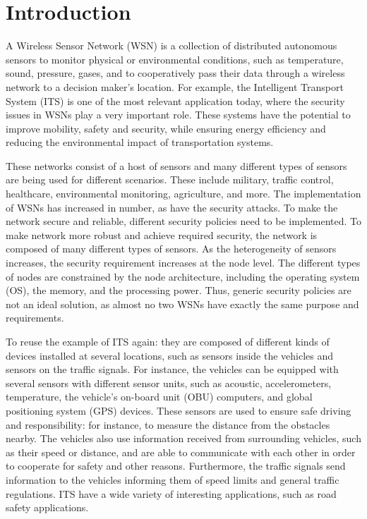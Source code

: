 \documentclass[12pt,a4paper,twoside]{report}
\begin{document}
\section{Introduction}
A Wireless Sensor Network (WSN) is a collection of distributed autonomous sensors to monitor physical or environmental conditions, such as temperature, sound, pressure, gases, and to cooperatively pass their data through a wireless network to a decision maker's location. For example, the Intelligent Transport System (ITS) is one of the most relevant application today, where the security issues in WSNs play a very important role. These systems have the potential to improve mobility, safety and security, while ensuring energy efficiency and reducing the environmental impact of transportation systems. \par
These networks consist of a host of sensors and many different types of sensors are being used for different scenarios. These include military, traffic control, healthcare, environmental monitoring, agriculture, and more. The implementation of WSNs has increased in number, as have the security attacks. To make the network secure and reliable, different security policies need to be implemented. To make network more robust and achieve required security, the network is composed of many different types of sensors. As the heterogeneity of sensors increases, the security requirement increases at the node level. The different types of nodes are constrained by the node architecture, including the operating system (OS), the memory, and the processing power. Thus, generic security policies are not an ideal solution, as almost no two WSNs have exactly the same purpose and requirements.\par
To reuse the example of ITS again: they are composed of different kinds of devices installed at several locations, such as sensors inside the vehicles and sensors on the traffic signals. For instance, the vehicles can be equipped with several sensors with different sensor units, such as acoustic, accelerometers, temperature, the vehicle's on-board unit (OBU) computers, and global positioning system (GPS) devices. These sensors are used to ensure safe driving and responsibility: for instance, to measure the distance from the obstacles nearby. The vehicles also use information received from surrounding vehicles, such as their speed or distance, and are able to communicate with each other in order to cooperate for safety and other reasons. Furthermore, the traffic signals send information to the vehicles informing them of speed limits and general traffic regulations. ITS have a wide variety of interesting applications, such as road safety applications.\par
\end{document}
